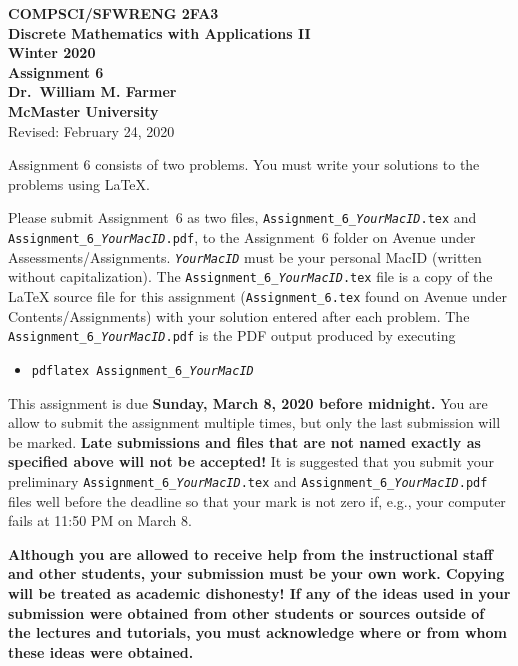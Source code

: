 \documentclass[11pt,fleqn]{article}
\begin{document}
\begin{center}

  {\large \textbf{COMPSCI/SFWRENG 2FA3}}\\[2mm]
  {\large \textbf{Discrete Mathematics with Applications II}}\\[2mm]
  {\large \textbf{Winter 2020}}\\[8mm]
  {\huge \textbf{Assignment 6}}\\[6mm]
  {\large \textbf{Dr.~William M. Farmer}}\\[2mm]
  {\large \textbf{McMaster University}}\\[6mm]
  {\large Revised: February 24, 2020}

\end{center}

\medskip

Assignment 6 consists of two problems.  You must write your solutions
to the problems using LaTeX.

Please submit Assignment~6 as two files,
\texttt{Assignment\_6\_\emph{YourMacID}.tex} and
\texttt{Assignment\_6\_\emph{YourMacID}.pdf}, to the Assignment~6
folder on Avenue under Assessments/Assignments.
\texttt{\emph{YourMacID}} must be your personal MacID (written without
capitalization).  The \texttt{Assignment\_6\_\emph{YourMacID}.tex}
file is a copy of the LaTeX source file for this assignment
(\texttt{Assignment\_6.tex} found on Avenue under
Contents/Assignments) with your solution entered after each problem.
The \texttt{Assignment\_6\_\emph{YourMacID}.pdf} is the PDF output
produced by executing

\begin{itemize}

  \item[] \texttt{pdflatex Assignment\_6\_\emph{YourMacID}}

\end{itemize}

This assignment is due \textbf{Sunday, March 8, 2020 before midnight.}
You are allow to submit the assignment multiple times, but only the
last submission will be marked.  \textbf{Late submissions and files
  that are not named exactly as specified above will not be accepted!}
It is suggested that you submit your preliminary
\texttt{Assignment\_6\_\emph{YourMacID}.tex} and
\texttt{Assignment\_6\_\emph{YourMacID}.pdf} files well before the
deadline so that your mark is not zero if, e.g., your computer fails
at 11:50 PM on March 8.

\textbf{Although you are allowed to receive help from the
  instructional staff and other students, your submission must be your
  own work.  Copying will be treated as academic dishonesty! If any of
  the ideas used in your submission were obtained from other students
  or sources outside of the lectures and tutorials, you must
  acknowledge where or from whom these ideas were obtained.}
\end{document}
